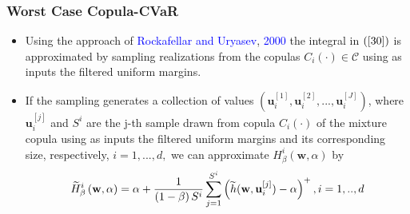 \documentclass[pdf,9pt,xcolor=dvipsnames,hide notes]{beamer}
\begin{document}
\begin{frame}[label=frame3e]
	\frametitle{Worst Case Copula-CVaR}
	
	\begin{itemize}
		\justifying
		
		\item 	Using the approach of \textcolor{blue}{Rockafellar and Uryasev}, \textcolor{blue}{2000} the integral in $\left( \ref{30}\right) $ is approximated by sampling realizations from the copulas $%
		C_{i}\left( \cdot \right) \in \mathcal{C}$ using as inputs the filtered
		uniform margins. 
		
		\vspace{0.3cm}
		
		\item If the sampling generates a collection of values $\left(
		\mathbf{u}_{i}^{[1]},\mathbf{u}_{i}^{[2]},...,\mathbf{u}_{i}^{[J]}\right) $,
		where $\mathbf{u}_{i}^{[j]}$ and $S^{i}$ are the j-th sample drawn from
		copula $C_{i}\left( \cdot \right) $ of the mixture copula using as inputs
		the filtered uniform margins and its corresponding size, respectively, $%
		i=1,...,d,$ we can approximate $H_{\beta }^{i}\left( \mathbf{w},\alpha
		\right) $ by
		\begin{equation}
		\widetilde{H}_{\beta }^{i}\left( \mathbf{w},\alpha \right) =\alpha +\frac{1}{%
			\left( 1-\beta \right) S^{i}}\sum_{j=1}^{S^{i}}\left( \widetilde{h}(\mathbf{w},\mathbf{u}%
		_{i}^{[j]})-\alpha \right) ^{+},i=1,..,d
		\end{equation}%
		
				
	\end{itemize}
	
	
\end{frame}
\end{document}
